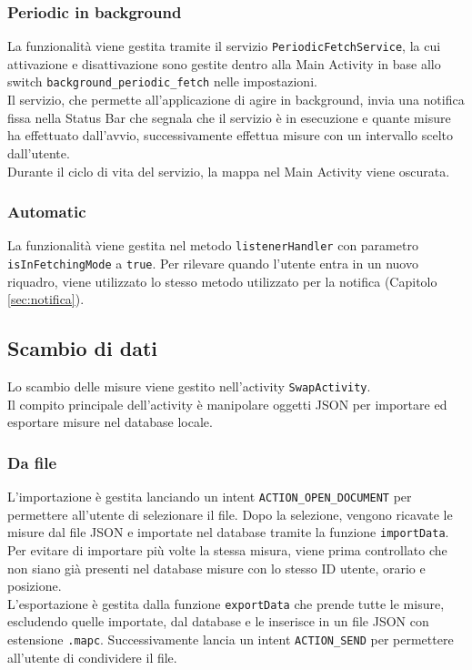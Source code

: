 \documentclass[11pt]{article}
\begin{document}
\subsubsection{Periodic in background}
La funzionalità viene gestita tramite il servizio \texttt{PeriodicFetchService}, la cui attivazione e disattivazione sono gestite dentro alla Main Activity in base allo switch \texttt{background\_periodic\_fetch} nelle impostazioni. \\
Il servizio, che permette all'applicazione di agire in background, invia una notifica fissa nella Status Bar che segnala che il servizio è in esecuzione e quante misure ha effettuato dall'avvio, successivamente effettua misure con un intervallo scelto dall'utente. \\
Durante il ciclo di vita del servizio, la mappa nel Main Activity viene oscurata.
\subsubsection{Automatic}
La funzionalità viene gestita nel metodo \texttt{listenerHandler} con parametro \texttt{isInFetchingMode} a \texttt{true}. Per rilevare quando l'utente entra in un nuovo riquadro, viene utilizzato lo stesso metodo utilizzato per la notifica (Capitolo \ref{sec:notifica}).
\subsection{Scambio di dati}
Lo scambio delle misure viene gestito nell'activity \texttt{SwapActivity}. \\
Il compito principale dell'activity è manipolare oggetti JSON per importare ed esportare misure nel database locale.
\subsubsection{Da file}
L'importazione è gestita lanciando un intent \texttt{ACTION\_OPEN\_DOCUMENT} per permettere all'utente di selezionare il file. Dopo la selezione, vengono ricavate le misure dal file JSON e importate nel database tramite la funzione \texttt{importData}. Per evitare di importare più volte la stessa misura, viene prima controllato che non siano già presenti nel database misure con lo stesso ID utente, orario e posizione. \\
L'esportazione è gestita dalla funzione \texttt{exportData} che prende tutte le misure, escludendo quelle importate, dal database e le inserisce in un file JSON con estensione \texttt{.mapc}. Successivamente lancia un intent \texttt{ACTION\_SEND} per permettere all'utente di condividere il file.
\end{document}
